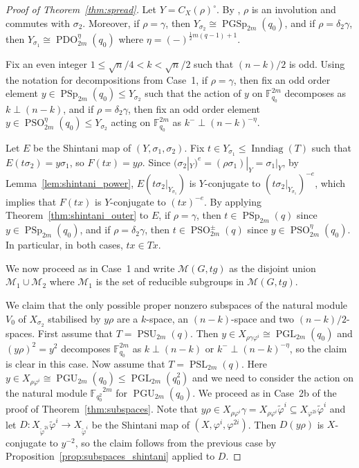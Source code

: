 \documentclass[11pt]{article}
\numberwithin{equation}{section}
\theoremstyle{shdefinition}
\theoremstyle{shplain}
\newcommand{\g}{\gamma}
\renewcommand{\d}{\delta}
\newcommand{\p}{\varphi}
\renewcommand{\wp}{\widetilde{\varphi}}
\newcommand{\s}{\sigma}
\newcommand{\M}{\mathcal{M}}
\newcommand{\<}{\langle}
\renewcommand{\>}{\rangle}
\renewcommand{\leq}{\leqslant}
\newcommand{\Inndiag}{\operatorname{Inndiag}}
\newcommand{\F}{\mathbb{F}}
\renewcommand{\:}{\colon}
\newcommand{\PSL}{\operatorname{PSL}}
\newcommand{\PGL}{\operatorname{PGL}}
\newcommand{\PSp}{\operatorname{PSp}}
\newcommand{\PGSp}{\operatorname{PGSp}}
\newcommand{\PSU}{\operatorname{PSU}}
\newcommand{\PGU}{\operatorname{PGU}}
\newcommand{\PSO}{\operatorname{PSO}}
\newcommand{\PDO}{\operatorname{PDO}}
\begin{document}
\begin{proof}[Proof of Theorem~\ref{thm:spread}]
Let $Y = C_X(\rho)^\circ$. By \cite[Propositions~6.4.7 and~6.6.2]{ref:Harper}, $\rho$ is an involution and commutes with $\s_2$. Moreover, if $\rho = \g$, then $Y_{\s_2} \cong \PGSp_{2m}(q_0)$, and if $\rho = \d_2\g$, then $Y_{\s_1} \cong \PDO^\eta_{2m}(q_0)$ where $\eta = (-)^{\frac{1}{2}m(q-1)+1}$. 

Fix an even integer $1 \leq \sqrt{n}/4 < k < \sqrt{n}/2$ such that $(n-k)/2$ is odd. Using the notation for decompositions from Case~1, if $\rho=\g$, then fix an odd order element $y \in \PSp_{2m}(q_0) \leq Y_{\s_2}$ such that the action of $y$ on $\F_{q_0}^{2m}$ decomposes as $k \perp (n-k)$, and if $\rho=\d_2\g$, then fix an odd order element $y \in \PSO^\eta_{2m}(q_0) \leq Y_{\s_2}$ acting on $\F_{q_0}^{2m}$ as $k^- \perp (n-k)^{-\eta}$.

Let $E$ be the Shintani map of $(Y,\s_1,\s_2)$. Fix $t \in Y_{\s_1} \leq \Inndiag(T)$ such that $E(t\s_2) = y\s_1$, so $F(tx) = y\rho$. Since $(\s_2|_Y)^e = (\rho\s_1)|_Y = \s_1|_Y$, by Lemma~\ref{lem:shintani_power}, $E(t\s_2|_{Y_{\s_1}})$ is $Y$-conjugate to $(t\s_2|_{Y_{\s_1}})^{-e}$, which implies that $F(tx)$ is $Y$-conjugate to $(tx)^{-e}$. By applying Theorem~\ref{thm:shintani_outer} to $E$, if $\rho = \g$, then $t \in \PSp_{2m}(q)$ since $y \in \PSp_{2m}(q_0)$, and if $\rho = \d_2\g$, then $t \in \PSO^\pm_{2m}(q)$ since $y \in \PSO^\eta_{2m}(q_0)$. In particular, in both cases, $tx \in Tx$. 

We now proceed as in Case~1 and write $\M(G,tg)$ as the disjoint union $\M_1 \cup \M_2$ where $\M_1$ is the set of reducible subgroups in $\M(G,tg)$. 

We claim that the only possible proper nonzero subspaces of the natural module $V_0$ of $X_{\s_2}$ stabilised by $y\rho$ are a $k$-space, an $(n-k)$-space and two $(n-k)/2$-spaces. First assume that $T = \PSU_{2m}(q)$. Then $y \in X_{\rho\g\p^i} \cong \PGL_{2m}(q_0)$ and $(y\rho)^2 = y^2$ decomposes $\F_{q_0}^{2m}$ as $k \perp (n-k)$ or $k^- \perp (n-k)^{-\eta}$, so the claim is clear in this case. Now assume that $T = \PSL_{2m}(q)$. Here $y \in X_{\rho\p^i} \cong \PGU_{2m}(q_0) \leq \PGL_{2m}(q_0^2)$ and we need to consider the action on the natural module ${\F_{q_0^2}}^{\!\!\!\!\!2m}$ for $\PGU_{2m}(q_0)$. We proceed as in Case~2b of the proof of Theorem~\ref{thm:subspaces}. Note that $y\rho \in X_{\rho\p^i}\g = X_{\rho\p^i}\wp^i \subseteq X_{\p^{2i}}\wp^i$ and let $D\:X_{\wp^{2i}}\wp^i \to X_{\wp^i}$ be the Shintani map of $(X,\p^i,\p^{2i})$. Then $D(y\rho)$ is $X$-conjugate to $y^{-2}$, so the claim follows from the previous case by Proposition~\ref{prop:subspaces_shintani} applied to $D$.


\end{proof}
\end{document}
